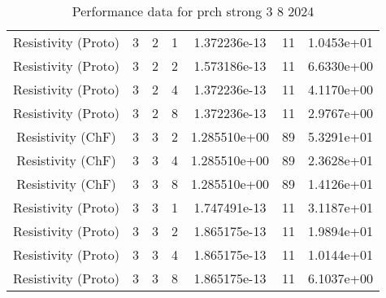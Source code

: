 \documentclass{article}
\begin{document}
\begin{small}
\begin{table}
\begin{center}
\begin{tabular}{|c|c|c|c|c|c||c|}
        Resistivity    (Proto) & 3 & 2 & 1& 1.372236e-13 & 11 & 1.0453e+01\\
        Resistivity    (Proto) & 3 & 2 & 2& 1.573186e-13 & 11 & 6.6330e+00\\
        Resistivity    (Proto) & 3 & 2 & 4& 1.372236e-13 & 11 & 4.1170e+00\\
        Resistivity    (Proto) & 3 & 2 & 8& 1.372236e-13 & 11 & 2.9767e+00\\
        \hline 
        Resistivity      (ChF) & 3 & 3 & 2& 1.285510e+00 & 89 & 5.3291e+01\\
        Resistivity      (ChF) & 3 & 3 & 4& 1.285510e+00 & 89 & 2.3628e+01\\
        Resistivity      (ChF) & 3 & 3 & 8& 1.285510e+00 & 89 & 1.4126e+01\\
        Resistivity    (Proto) & 3 & 3 & 1& 1.747491e-13 & 11 & 3.1187e+01\\
        Resistivity    (Proto) & 3 & 3 & 2& 1.865175e-13 & 11 & 1.9894e+01\\
        Resistivity    (Proto) & 3 & 3 & 4& 1.865175e-13 & 11 & 1.0144e+01\\
        Resistivity    (Proto) & 3 & 3 & 8& 1.865175e-13 & 11 & 6.1037e+00\\
        \hline 
      \end{tabular} 
    \end{center}   
    \caption{Performance data for  prch strong 3 8 2024} 
  \end{table} 
\end{small} 


\label{tab::datareductiontable3102024.helm} 
\label{tab::datareductiontable3102024.conduct} 
\label{tab::datareductiontable3102024.viscous} 
\label{tab::datareductiontable3102024.resist} 



\end{document}
